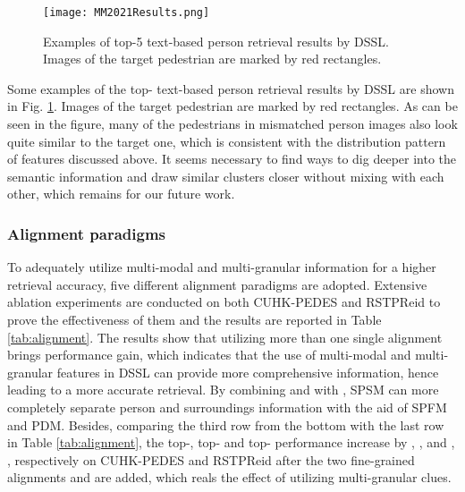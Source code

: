 \documentclass[sigconf]{acmart}
\begin{document}
\begin{figure}[h]
	\centering
	\texttt{[image: MM2021Results.png]}
	\caption{Examples of top-5 text-based person retrieval results by DSSL. Images of the target pedestrian are marked by red rectangles.}
	\label{fig:results}
\end{figure}

Some examples of the top- text-based person retrieval results by DSSL are shown in Fig. \ref{fig:results}. Images of the target pedestrian are marked by red rectangles. As can be seen in the figure, many of the pedestrians in mismatched person images also look quite similar to the target one, which is consistent with the distribution pattern of features discussed above. It seems necessary to find ways to dig deeper into the semantic information and draw similar clusters closer without mixing with each other, which remains for our future work.

\subsubsection{Alignment paradigms}
To adequately utilize multi-modal and multi-granular information for a higher retrieval accuracy, five different alignment paradigms are adopted. Extensive ablation experiments are conducted on both CUHK-PEDES and RSTPReid to prove the effectiveness of them and the results are reported in Table \ref{tab:alignment}. The results show that utilizing more than one single alignment brings performance gain, which indicates that the use of multi-modal and multi-granular features in DSSL can provide more comprehensive information, hence leading to a more accurate retrieval. By combining  and  with , SPSM can more completely separate person and surroundings information with the aid of SPFM and PDM. Besides, comparing the third row from the bottom with the last row in Table \ref{tab:alignment}, the top-, top- and top- performance increase by , ,  and , ,  respectively on CUHK-PEDES and RSTPReid after the two fine-grained alignments  and  are added, which reals the effect of utilizing multi-granular clues.
\end{document}
